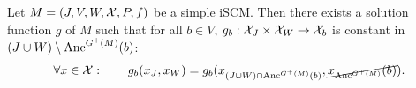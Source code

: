 \begin{Lem}\label{lem:scm_structural_minimality_solution_function}
  Let $M = \left ( J, V, W, \mathcal{X}, P, f \right )$ be a simple iSCM.
%
%
  Then there exists a solution function $g$ of $M$ such that for all $b \in V$,
  $g_b : \mathcal{X}_J \times \mathcal{X}_W \to \mathcal{X}_b$ is constant in $(J \cup W) \setminus \mathrm{Anc}^{G^+(M)}(b)$:
    $$\forall x \in \mathcal{X}: \qquad g_b(x_J,x_W) = g_b(x_{(J \cup W) \cap \mathrm{Anc}^{G^+(M)}(b)},\cancel{x_{\mathrm{Anc}^{G^+(M)}}(b)}).$$
\end{Lem}
